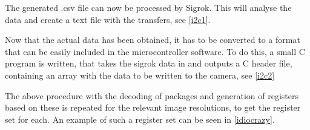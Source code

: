 The generated .csv file can now be processed by Sigrok. This will analyse the data and create a text file with the \iic transfers, see \autoref{i2c1}.

Now that the actual \iic data has been obtained, it has to be converted to a format that can be easily included in the microcontroller software. To do this, a small C program is written, that takes the sigrok data in and outputs a C header file, containing an array with the data to be written to the camera, see \autoref{i2c2}





The above procedure with the decoding of \iic packages and generation of registers based on these is repeated for the relevant image resolutions, to get the register set for each. An example of such a register set can be seen in \autoref{idiocrazy}.

